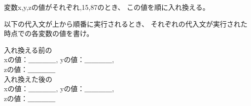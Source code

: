 \documentclass[12pt,a4j]{jarticle}
\newcounter{toi}
\def\toi{%
\bigskip\bigskip\noindent
\addtocounter{toi}{1}
\shadowbox{\bfseries\large 問\thetoi}
\nopagebreak[4]\bigskip\nopagebreak[4]
}
\begin{document}






\toi

変数{\ttfamily x,y,z}の値がそれぞれ{,15,87}のとき、
この値を順に入れ換える。

以下の代入文が上から順番に実行されるとき、
それぞれの代入文が実行された時点での各変数の値を書け。

\begin{center}
 \hfil
 \begin{minipage}{.4\linewidth}
 \begin{center}
 \end{center}
 \end{minipage}
 \hfil
 \begin{minipage}{.4\linewidth}
 \noindent
 入れ換える前の\\
  {\ttfamily x}の値：＿＿＿＿,
  {\ttfamily y}の値：＿＿＿＿,\\
  {\ttfamily z}の値：＿＿＿＿\\

  入れ換えた後の\\
  {\ttfamily x}の値：＿＿＿＿,
  {\ttfamily y}の値：＿＿＿＿,\\ 
  {\ttfamily z}の値：＿＿＿＿
 \end{minipage}
 \hfill
\end{center}
\end{document}

